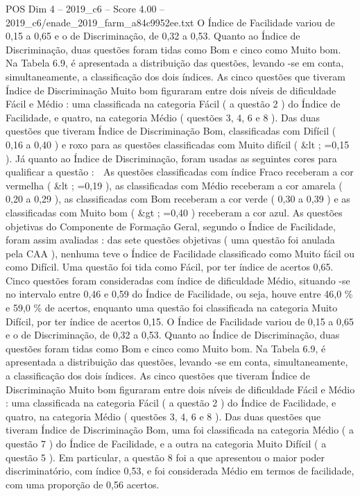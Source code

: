 \begin{textsample}{POS Dim 4 – 2019\_c6 – Score 4.00 – 2019\_c6/enade\_2019\_farm\_a84c9952ee.txt}
O Índice de Facilidade variou de 0,15 a 0,65 e o de Discriminação, de 0,32 a 0,53.
Quanto ao Índice de Discriminação, duas questões foram tidas como Bom e cinco como Muito bom.
Na Tabela 6.9, é apresentada a distribuição das questões, levando -se em conta, simultaneamente, a classificação dos dois índices.
As cinco questões que tiveram Índice de Discriminação Muito bom figuraram entre dois níveis de dificuldade Fácil e Médio : uma classificada na categoria Fácil ( a questão 2 ) do Índice de Facilidade, e quatro, na categoria Médio ( questões 3, 4, 6 e 8 ).
Das duas questões que tiveram Índice de Discriminação Bom, classificadas com Difícil ( 0,16 a 0,40 ) e roxo para as questões classificadas com Muito difícil ( \&lt ; =0,15 ).
Já quanto ao Índice de Discriminação, foram usadas as seguintes cores para qualificar a questão :  As questões classificadas com índice Fraco receberam a cor vermelha ( \&lt ; =0,19 ), as classificadas com Médio receberam a cor amarela ( 0,20 a 0,29 ), as classificadas com Bom receberam a cor verde ( 0,30 a 0,39 ) e as classificadas com Muito bom ( \&gt ; =0,40 ) receberam a cor azul.
As questões objetivas do Componente de Formação Geral, segundo o Índice de Facilidade, foram assim avaliadas : das sete questões objetivas ( uma questão foi anulada pela CAA ), nenhuma teve o Índice de Facilidade classificado como Muito fácil ou como Difícil.
Uma questão foi tida como Fácil, por ter índice de acertos 0,65.
Cinco questões foram consideradas com índice de dificuldade Médio, situando -se no intervalo entre 0,46 e 0,59 do Índice de Facilidade, ou seja, houve entre 46,0 \% e 59,0 \% de acertos, enquanto uma questão foi classificada na categoria Muito Difícil, por ter índice de acertos 0,15.
O Índice de Facilidade variou de 0,15 a 0,65 e o de Discriminação, de 0,32 a 0,53.
Quanto ao Índice de Discriminação, duas questões foram tidas como Bom e cinco como Muito bom.
Na Tabela 6.9, é apresentada a distribuição das questões, levando -se em conta, simultaneamente, a classificação dos dois índices.
As cinco questões que tiveram Índice de Discriminação Muito bom figuraram entre dois níveis de dificuldade Fácil e Médio : uma classificada na categoria Fácil ( a questão 2 ) do Índice de Facilidade, e quatro, na categoria Médio ( questões 3, 4, 6 e 8 ).
Das duas questões que tiveram Índice de Discriminação Bom, uma foi classificada na categoria Médio ( a questão 7 ) do Índice de Facilidade, e a outra na categoria Muito Difícil ( a questão 5 ).
Em particular, a questão 8 foi a que apresentou o maior poder discriminatório, com índice 0,53, e foi considerada Médio em termos de facilidade, com uma proporção de 0,56 acertos.

\end{textsample}
